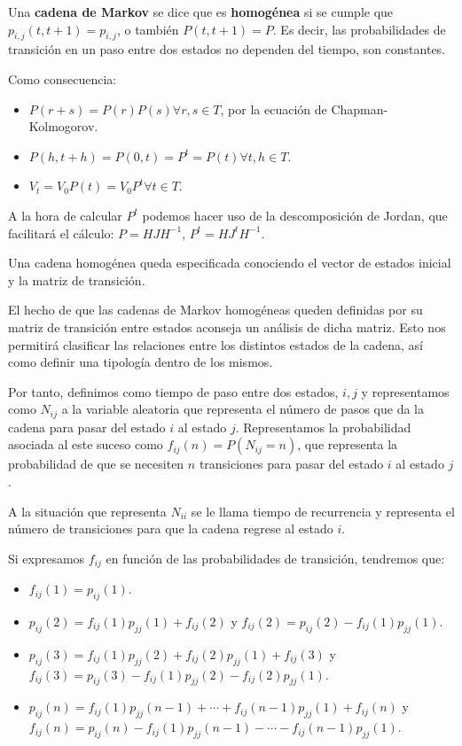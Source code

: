 
\begin{definicion}
Una \textbf{cadena de Markov} se dice que es \textbf{homog\'enea} si se cumple que $p_{i,j}(t,t+1)=p_{i,j}$, o tambi\'en $P(t,t+1)=P$. Es decir, las probabilidades de transici\'on en un paso entre dos estados no dependen del tiempo, son constantes.
\end{definicion}

Como consecuencia:
\begin{itemize}
\item $P(r+s)=P(r)P(s) \forall r,s\in T$, por la ecuaci\'on de Chapman-Kolmogorov.
\item $P(h,t+h)=P(0,t)=P^t=P(t) \forall t,h\in T$.
\item $V_t=V_0P(t)=V_0P^t \forall t\in T$.
\end{itemize}

A la hora de calcular $P^t$ podemos hacer uso de la descomposici\'on de Jordan, que facilitar\'a el c\'alculo: $P=HJH^{-1}$, $P^t=HJ^tH^{-1}$.

Una cadena homog\'enea queda especificada conociendo el vector de estados inicial y la matriz de transici\'on.


El hecho de que las cadenas de Markov homog\'eneas queden definidas por su matriz de transici\'on entre estados aconseja un an\'alisis de dicha matriz. Esto nos permitir\'a clasificar las relaciones entre los distintos estados de la cadena, as\'i como definir una tipolog\'ia dentro de los mismos.

Por tanto, definimos como tiempo de paso entre dos estados, $i, j$ y representamos como $N_{ij}$ a la variable aleatoria que representa el n\'umero de pasos que da la cadena para pasar del estado $i$ al estado $j$. Representamos la probabilidad asociada al este suceso como $f_{ij}(n)=P(N_{ij}=n)$, que representa la probabilidad de que se necesiten $n$ transiciones para pasar del estado $i$ al estado $j$.

A la situaci\'on que representa $N_{ii}$ se le llama tiempo de recurrencia y representa el n\'umero de transiciones para que la cadena regrese al estado $i$.

Si expresamos $f_{ij}$ en funci\'on de las probabilidades de transici\'on, tendremos que:
\begin{itemize}
\item $f_{ij}(1)=p_{ij}(1)$.
\item $p_{ij}(2)=f_{ij}(1)p_{jj}(1)+f_{ij}(2)$ y $f_{ij}(2)=p_{ij}(2)-f_{ij}(1)p_{jj}(1)$.
\item $p_{ij}(3)=f_{ij}(1)p_{jj}(2)+f_{ij}(2)p_{jj}(1)+f_{ij}(3)$ y $f_{ij}(3)=p_{ij}(3)-f_{ij}(1)p_{jj}(2)-f_{ij}(2)p_{jj}(1)$.
\item $p_{ij}(n)=f_{ij}(1)p_{jj}(n-1)+\cdots+f_{ij}(n-1)p_{jj}(1)+f_{ij}(n)$ y $f_{ij}(n)=p_{ij}(n)-f_{ij}(1)p_{jj}(n-1)-\cdots-f_{ij}(n-1)p_{jj}(1)$.
\end{itemize}

